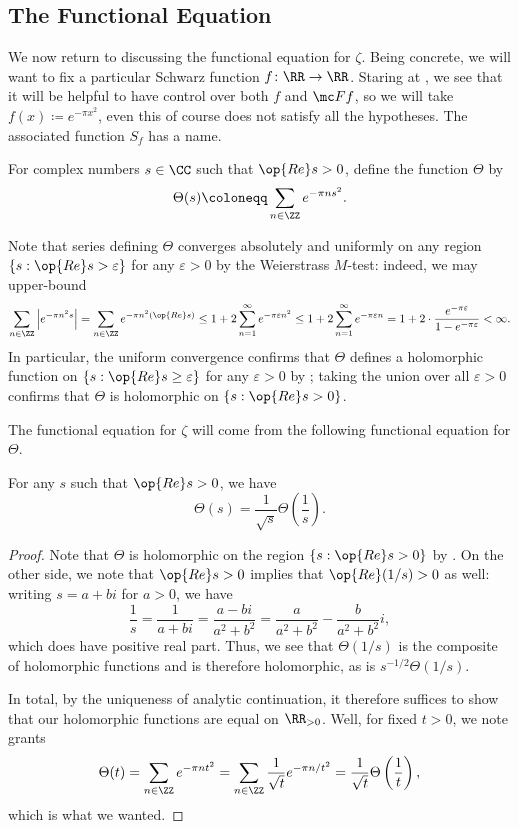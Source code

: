 \documentclass[../notes.tex]{subfiles}
\begin{document}
\subsection{The Functional Equation}
We now return to discussing the functional equation for $\zeta$. Being concrete, we will want to fix a particular Schwarz function $f\colon\RR\to\RR$. Staring at , we see that it will be helpful to have control over both $f$ and $\mc Ff$, so we will take $f(x)\coloneqq e^{-\pi x^2}$, even this of course does not satisfy all the hypotheses. The associated function $S_f$ has a name.
\begin{defihelper}[$\Gamma$] 
	For complex numbers $s\in\CC$ such that $\op{Re}s>0$, define the function $\Theta$ by
	\[\Theta(s)\coloneqq\sum_{n\in\ZZ}e^{-\pi ns^2}.\]
\end{defihelper}
\begin{remark} \label{rem:theta-converges}
	Note that series defining $\Theta$ converges absolutely and uniformly on any region $\{s:\op{Re}s>\varepsilon\}$ for any $\varepsilon>0$ by the Weierstrass $M$-test: indeed, we may upper-bound
	\[\sum_{n\in\ZZ}\left|e^{-\pi n^2s}\right|=\sum_{n\in\ZZ}e^{-\pi n^2(\op{Re}s)}\le1+2\sum_{n=1}^\infty e^{-\pi\varepsilon n^2}\le1+2\sum_{n=1}^\infty e^{-\pi\varepsilon n}=1+2\cdot\frac{e^{-\pi\varepsilon}}{1-e^{-\pi\varepsilon}}<\infty.\]
	In particular, the uniform convergence confirms that $\Theta$ defines a holomorphic function on $\{s:\op{Re}s\ge\varepsilon\}$ for any $\varepsilon>0$ by ; taking the union over all $\varepsilon>0$ confirms that $\Theta$ is holomorphic on $\{s:\op{Re}s>0\}$.
\end{remark}
The functional equation for $\zeta$ will come from the following functional equation for $\Theta$.
\begin{proposition} \label{prop:theta-func-eq}
	For any $s$ such that $\op{Re}s>0$, we have
	\[\Theta(s)=\frac1{\sqrt s}\Theta\left(\frac1s\right).\]
\end{proposition}
\begin{proof}
	Note that $\Theta$ is holomorphic on the region $\{s:\op{Re}s>0\}$ by . On the other side, we note that $\op{Re}s>0$ implies that $\op{Re}(1/s)>0$ as well: writing $s=a+bi$ for $a>0$, we have
	\[\frac1s=\frac1{a+bi}=\frac{a-bi}{a^2+b^2}=\frac a{a^2+b^2}-\frac{b}{a^2+b^2}i,\]
	which does have positive real part. Thus, we see that $\Theta(1/s)$ is the composite of holomorphic functions and is therefore holomorphic, as is $s^{-1/2}\Theta(1/s)$.

	In total, by the uniqueness of analytic continuation, it therefore suffices to show that our holomorphic functions are equal on $\RR_{>0}$. Well, for fixed $t>0$, we note  grants
	\[\Theta(t)=\sum_{n\in\ZZ}e^{-\pi nt^2}=\sum_{n\in\ZZ}\frac1{\sqrt t}e^{-\pi n/t^2}=\frac1{\sqrt t}\Theta\left(\frac1t\right),\]
	which is what we wanted.
\end{proof}
\end{document}
